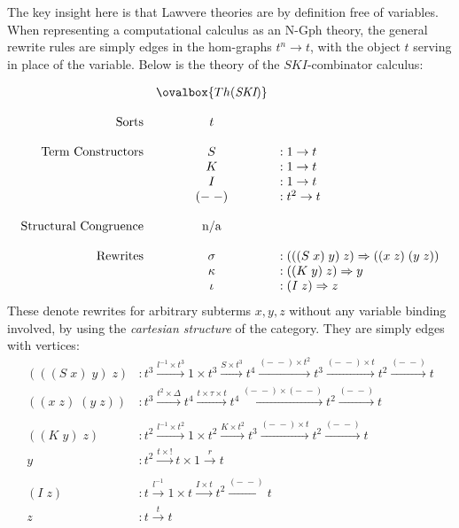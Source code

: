 \documentclass[a4paper,UKenglish]{article}
\theoremstyle{definition}
\newcommand{\Gph}{\mathrm{Gph}}
\newcommand{\NN}{\mathrm{N}}
\begin{document}
The key insight here is that Lawvere theories are by definition free of variables. When representing a computational calculus as an $\NN$-$\Gph$ theory, the general rewrite rules are simply edges in the hom-graphs $t^n \to t$, with the object $t$ serving in place of the variable. Below is the theory of the $SKI$-combinator calculus:

\[\begin{array}{rcl}
& \ovalbox{Th(\textit{SKI})} &\\\\
\text{Sorts} & t &\\\\
\text{Term Constructors} & S & :1 \to t\\
& K & :1 \to t\\
& I & :1 \to t\\
& (-\; -) & : t^2 \to t\\\\
\text{Structural Congruence} & \text{n/a} &\\\\
\mathrm{Rewrites} & \sigma & :(((S\; x)\; y)\; z) \Rightarrow ((x\; z)\; (y\; z))\\
& \kappa & :((K\; y)\; z) \Rightarrow y\\
& \iota & :(I\; z) \Rightarrow z\\
\end{array}\]
These denote rewrites for arbitrary subterms $x, y, z$ without any variable binding involved, by using the \textit{cartesian structure} of the category. They are simply edges with vertices:
\[\begin{array}{rl}
(((S\; x)\; y)\; z)&: t^3 \xrightarrow{l^{-1} \times t^3} 1\times t^3 \xrightarrow{S \times t^3} t^4 \xrightarrow{(-\;-)\times t^2} t^3 \xrightarrow{(-\;-) \times t} t^2 \xrightarrow{(-\;-)} t\\
((x\; z)\; (y\; z))&: t^3 \xrightarrow{t^2 \times \Delta} t^4 \xrightarrow{t \times \tau \times t} t^4 \xrightarrow{(-\;-) \times (-\;-)} t^2 \xrightarrow{(-\;-)} t\\\\
((K\; y)\; z)&: t^2 \xrightarrow{l^{-1} \times t^2} 1\times t^2 \xrightarrow{K \times t^2} t^3 \xrightarrow{(-\;-)\times t} t^2 \xrightarrow{(-\;-)} t\\
y&: t^2 \xrightarrow{t \times !} t \times 1 \xrightarrow{r} t\\\\
(I\; z)&: t \xrightarrow{l^{-1}} 1\times t \xrightarrow{I \times t} t^2 \xrightarrow{(-\;-)} t\\
z&: t \xrightarrow{t} t
\end{array}\]
\end{document}

